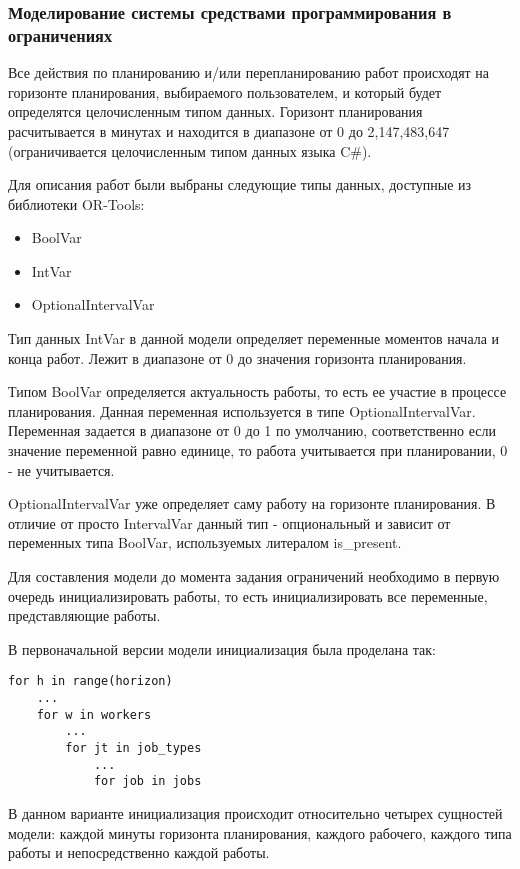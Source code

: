 
\subsubsection{Моделирование системы средствами программирования в ограничениях}

Все действия по планированию и/или перепланированию работ происходят на горизонте планирования, выбираемого пользователем, и который будет определятся целочисленным типом данных. Горизонт планирования расчитывается в минутах и находится в диапазоне от 0 до 2,147,483,647 (ограничивается целочисленным типом данных языка C\#).

Для описания работ были выбраны следующие типы данных, доступные из библиотеки OR-Tools:
\begin{itemize}
	\item BoolVar
	\item IntVar
	\item OptionalIntervalVar
\end{itemize}

Тип данных IntVar в данной модели определяет переменные моментов начала и конца работ. Лежит в диапазоне от 0 до значения горизонта планирования.

Типом BoolVar определяется актуальность работы, то есть ее участие в процессе планирования. Данная переменная используется в типе OptionalIntervalVar. Переменная задается в диапазоне от 0 до 1 по умолчанию, соответственно если значение переменной равно единице, то работа учитывается при планировании, 0 - не учитывается.

OptionalIntervalVar уже определяет саму работу на горизонте планирования. В отличие от просто IntervalVar данный тип - опциональный и зависит от переменных типа BoolVar, используемых литералом is\_present.

Для составления модели до момента задания ограничений необходимо в первую очередь инициализировать работы, то есть инициализировать все переменные, представляющие работы.

В первоначальной версии модели инициализация была проделана так:
\begin{verbatim}
for h in range(horizon)
    ...
    for w in workers
        ...
        for jt in job_types
            ...
            for job in jobs
\end{verbatim}

В данном варианте инициализация происходит относительно четырех сущностей модели: каждой минуты горизонта планирования, каждого рабочего, каждого типа работы и непосредственно каждой работы.

